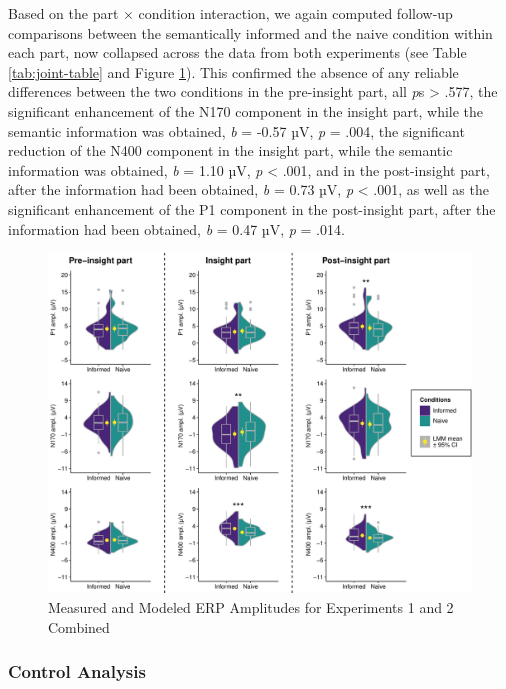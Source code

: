 \documentclass[
  english,
  man,floatsintext]{apa7}
\begin{document}
Based on the part × condition interaction, we again computed follow-up comparisons between the semantically informed and the naive condition within each part, now collapsed across the data from both experiments (see Table \ref{tab:joint-table} and Figure \ref{fig:joint-plot}). This confirmed the absence of any reliable differences between the two conditions in the pre-insight part, all \emph{p}s \textgreater{} .577, the significant enhancement of the N170 component in the insight part, while the semantic information was obtained, \emph{b} = -0.57 µV, \emph{p} = .004, the significant reduction of the N400 component in the insight part, while the semantic information was obtained, \emph{b} = 1.10 µV, \emph{p} \textless{} .001, and in the post-insight part, after the information had been obtained, \emph{b} = 0.73 µV, \emph{p} \textless{} .001, as well as the significant enhancement of the P1 component in the post-insight part, after the information had been obtained, \emph{b} = 0.47 µV, \emph{p} = .014.



\begin{figure}

{\centering \includegraphics[width=1\linewidth]{manuscript_files/figure-latex/joint-plot-1} 

}

\caption{Measured and Modeled ERP Amplitudes for Experiments 1 and 2 Combined\smallskip}\label{fig:joint-plot}
\end{figure}

\hypertarget{control-analysis}{%
\subsubsection{Control Analysis}\label{control-analysis}}
\end{document}
